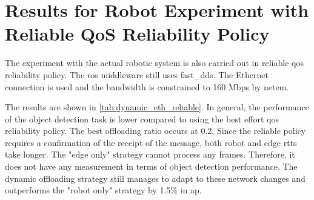 \chapter{Results for Robot Experiment with Reliable QoS Reliability Policy}\label{ch:appendix_a}

The experiment with the actual robotic system is also carried out in reliable \gls{qos} reliability policy. The \gls{ros} middleware still uses \gls{fast_dds}. The Ethernet connection is used and the bandwidth is constrained to 160 Mbps by \gls{netem}. 

The results are shown in \cref{tab:dynamic_eth_reliable}. In general, the performance of the object detection task is lower compared to using the best effort \gls{qos} reliability policy. The best offloading ratio occurs at 0.2. Since the reliable policy requires a confirmation of the receipt of the message, both robot and edge \glspl{rtt} take longer. The "edge only" strategy cannot process any frames. Therefore, it does not have any measurement in terms of object detection performance. The dynamic offloading strategy still manages to adapt to these network changes and outperforms the "robot only" strategy by 1.5\% in \gls{ap}. 

